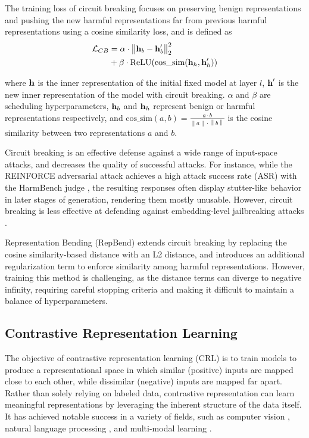 \documentclass[11pt]{article}
\begin{document}
\newcommand{\norm}[1]{\left\lVert #1 \right\rVert}
\newcommand{\cossim}{\text{cos\_sim}}
\newcommand{\ReLU}{\text{ReLU}}

The training loss of circuit breaking focuses on preserving benign representations and pushing the new harmful representations far from previous harmful representations using a cosine similarity loss, and is defined as
\begin{align}
	\mathcal{L}_{CB} &= \alpha \cdot \norm{\h_{b} - \h^\prime_b}_2^2 \notag\\
    &+ \beta \cdot \ReLU(\cossim(\h_h, \h^\prime_h)) \label{eq:cb_loss}
\end{align}

where $\textbf{h}$ is the inner representation of the initial fixed model at layer $l$, $\textbf{h}^\prime$ is the new inner representation of the model with circuit breaking.
$\alpha$ and $\beta$ are scheduling hyperparameters, $\textbf{h}_b$ and $\textbf{h}_h$ represent benign or harmful representations respectively,
and $\cossim(a, b) = \frac{a \cdot b}{\norm{a} \cdot \norm{b}}$ is the cosine similarity between two representations $a$ and $b$.

Circuit breaking is an effective defense against a wide range of input-space attacks,
and decreases the quality of successful attacks.
For instance, while the REINFORCE adversarial attack \citep{geisler2025reinforceadversarialattackslarge} achieves a high attack success rate (ASR) with the HarmBench judge \citep{mazeika2024harmbenchstandardizedevaluationframework}, the resulting responses often display stutter-like behavior in later stages of generation, rendering them mostly unusable.
However, circuit breaking is less effective at defending against embedding-level jailbreaking attacks \citep{schwinn2024revisitingrobustalignmentcircuit}.

Representation Bending (RepBend) \citep{yousefpour2025representationbendinglargelanguage} extends circuit breaking by replacing the cosine similarity-based distance with an L2 distance, and introduces an additional regularization term to enforce similarity among harmful representations. However, training this method is challenging,
as the distance terms can diverge to negative infinity, requiring careful stopping criteria and making it difficult
to maintain a balance of hyperparameters.

\subsection{Contrastive Representation Learning}
The objective of contrastive representation learning (CRL) is to train models to produce a representational space in which
similar (positive) inputs are mapped close to each other, while dissimilar (negative) inputs are mapped far apart.
Rather than solely relying on labeled data, contrastive representation can learn meaningful representations
by leveraging the inherent structure of the data itself. It has achieved notable success in a variety of fields,
such as computer vision \citep{Le_Khac_2020, Schroff_2015}, natural language processing \citep{mikolov2013efficientestimationwordrepresentations, rim2021adversarialtrainingcontrastivelearning}, and multi-modal learning \citep{radford2021learningtransferablevisualmodels}.
\end{document}
